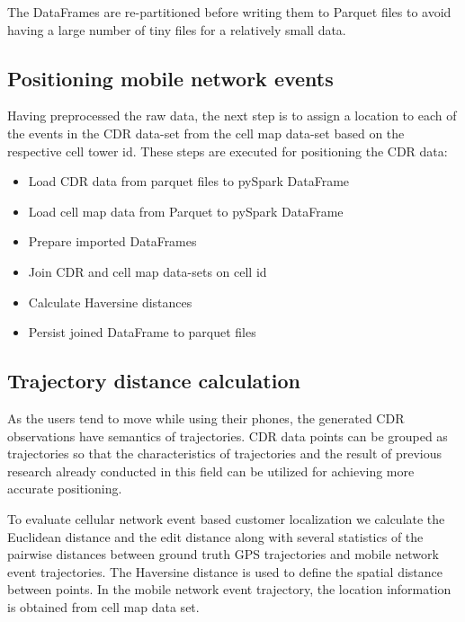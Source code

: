 The DataFrames are re-partitioned before writing them to Parquet files to avoid having a large number of tiny files for a relatively small data. 

\subsection{Positioning mobile network events}
Having preprocessed the raw data, the next step is to assign a location to each of the events in the CDR data-set from the cell map data-set based on the respective cell tower id. 
These steps are executed for positioning the CDR data:
\begin{itemize}
    \item Load CDR data from parquet files to pySpark DataFrame
    \item Load cell map data from Parquet to pySpark DataFrame
    \item Prepare imported DataFrames
    \item Join CDR and cell map data-sets on cell id
    \item Calculate Haversine distances
    \item Persist joined DataFrame to parquet files
\end{itemize}

\subsection{Trajectory distance calculation}
As the users tend to move while using their phones, the generated CDR observations have semantics of trajectories. CDR data points can be grouped as trajectories so that the characteristics of trajectories and the result of previous research already conducted in this field can be utilized for achieving more accurate positioning.

To evaluate cellular network event based customer localization we calculate the Euclidean distance and the edit distance along with several statistics of the pairwise distances between ground truth GPS trajectories and mobile network event trajectories. The Haversine distance is used to define the spatial distance between points. In the mobile network event trajectory, the location information is obtained from cell map data set.

